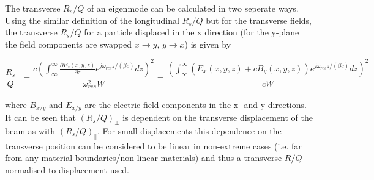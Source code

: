 The transverse $R_{s}/Q$ of an eigenmode can be calculated in two seperate ways. Using the similar definition of the longitudinal $R_{s}/Q$ but for the transverse fields, the transverse $R_{s}/Q$ for a particle displaced in the x direction (for the y-plane the field components are swapped $x \rightarrow y$, $y \rightarrow x$) is given by \cite{AlexejGrudiev}

\begin{equation}
\frac{R_{s}}{Q}_{\perp} = \frac{c \left( \int^{\infty}_{\infty} \frac{\partial E_{z} \left( x,y,z \right)}{\partial z} e^{j \omega_{res}z/\left( \beta c \right)} dz\right)^{2}}{\omega_{res}^{2}W} = \frac{ \left( \int^{\infty}_{\infty}  \left( E_{x} \left( x,y,z \right) + c B_{y} \left( x,y,z \right) \right) e^{j \omega_{res}z/\left( \beta c \right)} dz\right)^{2}}{cW}
\end{equation}

where $B_{x/y}$ and $E_{x/y}$ are the electric field components in the x- and y-directions. It can be seen that $(R_{s}/Q)_{\perp}$ is dependent on the transverse displacement of the beam as with $(R_{s}/Q)_{\parallel}$. For small displacements this dependence on the transverse position can be considered to be linear in non-extreme cases (i.e. far from any material boundaries/non-linear materials) and thus a transverse $R/Q$ normalised to displacement used.
